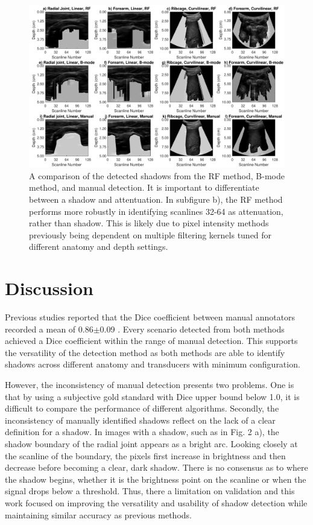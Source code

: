 \documentclass[preprint,5p,authoryear]{elsarticle}
\begin{document}
\begin{figure}
	\centering
		\caption{A comparison of the detected shadows from the RF method, B-mode method, and manual detection. It is important to differentiate between$  $ a shadow and attentuation. In subfigure b), the RF method performs more robustly in identifying scanlines 32-64 as attenuation, rather than shadow. This is likely due to pixel intensity methods previously being dependent on multiple filtering kernels tuned for different anatomy and depth settings.}
		\includegraphics[scale=0.55]{fig1.pdf}
\end{figure}


\section*{Discussion}
\label{Discuss}
Previous studies reported that the Dice coefficient between manual annotators recorded a mean of 0.86$\pm$0.09 \citep{Hellier2010} . Every scenario detected from both methods achieved a Dice coefficient within the range of manual detection. This supports the versatility of the detection method as both methods are able to identify shadows across different anatomy and transducers with minimum configuration. 

However, the inconsistency of manual detection presents two problems. One is that by using a subjective gold standard with Dice upper bound below 1.0, it is difficult to compare the performance of different algorithms. Secondly, the inconsistency of manually identified shadows reflect on the lack of a clear definition for a shadow. In images with a shadow, such as in Fig. 2 a), the shadow boundary of the radial joint appears as a bright arc. Looking closely at the scanline of the boundary, the pixels first increase in brightness and then decrease before becoming a clear, dark shadow. There is no consensus as to where the shadow begins, whether it is the brightness point on the scanline or when the signal drops below a threshold. Thus, there a limitation on validation and this work focused on improving the versatility and usability of shadow detection while maintaining similar accuracy as previous methods.
\end{document}
